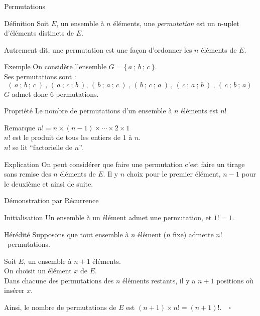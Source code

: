 \documentclass{coursbook}
\begin{document}
    \begin{Gpartie}{Permutations}
        \begin{Spartie}{Définition}
            Soit $E$, un ensemble à $n$ éléments, une \emph{permutation} est un n-uplet d'éléments distincts de $E$.

            Autrement dit, une permutation est une façon d'ordonner les $n$ éléments de $E$.
            \begin{SSpartie}{Exemple}
                On considère l'ensemble $G=\big\{\,a~;\,b~;\,c~\big\}$. \\ Ses permutations sont :
                \[(\,a~;\,b~;\,c~)~,\,(\,a~;\,c~;\,b~),\,(\,b~;\,a~;\,c~)~,\,(\,b~;\,c~;\,a~)~,\,(\,c~;\,a~;\,b~)~,\,(\,c~;\,b~;\,a)~\]
                $G$ admet donc 6 permutations.
            \end{SSpartie}
        \end{Spartie}
        \pagebreak
        \begin{Spartie}{Propriété}
            Le nombre de permutations d'un ensemble à $n$ éléments est $n!$
            \begin{SSpartie}{Remarque}
                $n! =n\times(n-1)\times\dotsb\times 2\times 1$ \\
                $n!$ est le produit de tous les entiers de $1$ à $n$. \\
                $n!$ se lit ``factorielle de $n$''.
            \end{SSpartie}
            \begin{SSpartie}{Explication}
                On peut considérer que faire une permutation c'est faire un tirage sans remise des $n$ éléments de $E$. Il y $n$ choix pour le premier élément, $n-1$ pour le deuxième et ainsi de suite.
            \end{SSpartie}
            \begin{SSpartie}{Démonstration par Récurrence}
                \begin{SSSpartie}{Initialisation}
                    Un ensemble à un élément admet une permutation, et $1! =1$.
                \end{SSSpartie}
                \begin{SSSpartie}{Hérédité}
                    Supposons que tout ensemble à $n$ élément ($n$ fixe) admette $n!$~permutations.

                    Soit $E$, un ensemble à $n+1$ éléments. \\
                    On choisit un élément $x$ de $E$. \\
                    Dans chacune des permutations des $n$ éléments restants, il y a $n+1$ positions où insérer $x$.

                    Ainsi, le nombre de permutations de $E$ est $(n+1)\times n! =(n+1)!$.$\quad\square$
                \end{SSSpartie}
            \end{SSpartie}
        \end{Spartie}
    \end{Gpartie}
\end{document}
